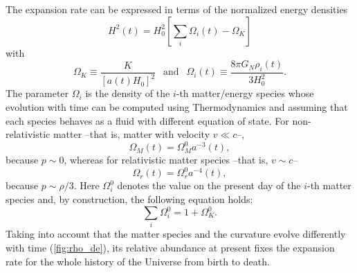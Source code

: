 The expansion rate can be expressed in terms of the normalized energy densities
\begin{equation}
H^2(t) = H_0^2\left[\sum_i\Omega_i(t)-\Omega_K\right]
\label{eq:flrw}
\end{equation}
with
\begin{equation}
\Omega_K\equiv\frac{K}{[a(t)H_0]^2}\ \ \mbox{ and }\ \ \Omega_i(t)\equiv \frac{8\pi G_N\rho_i(t)}{3H_0^2}.
\end{equation}
The parameter $\Omega_i$ is the density of the $i$-th matter/energy species whose evolution with time can be computed using Thermodynamics and assuming that each species behaves as a fluid with different equation of state. For non-relativistic matter --that is, matter with velocity $v\ll c$--, 
\begin{equation}
\Omega_M(t) = \Omega_M^0a^{-3}(t),
\end{equation}
because $p\sim 0$, whereas for relativistic matter species --that is, $v\sim c$--
\begin{equation}
\Omega_r(t) = \Omega_r^0 a^{-4}(t),
\end{equation}
because $p\sim\rho/3$. Here $\Omega_i^0$ denotes the value on the present day of the $i$-th matter species and, by construction, the following equation holds:
\begin{equation}
\sum_i\Omega_i^0=1+\Omega_K^0.
\label{eq:conservationenergy}
\end{equation}
Taking into account that the matter species and the curvature evolve differently with time (\autoref{fig:rho_de}), its relative abundance at present fixes the expansion rate for the whole history of the Universe from birth to death.
